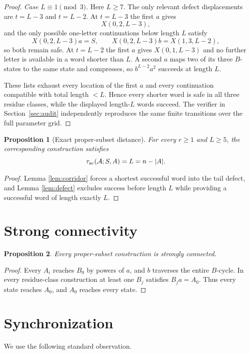 \documentclass[11pt]{article}
\newtheorem{proposition}{Proposition}
\theoremstyle{definition}
\theoremstyle{remark}
\newcommand{\Acal}{\mathcal A}
\newcommand{\tauac}{\tau_{\rm ac}}
\begin{document}
\begin{proof}
\smallskip
\noindent\emph{Case $L\equiv1\pmod3$.}
Here $L\ge7$. The only relevant defect displacements are $t=L-3$ and $t=L-2$. At $t=L-3$ the first $a$ gives
\[
X(0,2,L-3),
\]
and the only possible one-letter continuations below length $L$ satisfy
\[
X(0,2,L-3)a=S,\qquad
X(0,2,L-3)b=X(1,3,L-2),
\]
so both remain safe. At $t=L-2$ the first $a$ gives $X(0,1,L-3)$ and no further letter is available in a word shorter than $L$. A second $a$ maps two of its three $B$-states to the same state and compresses, so $b^{L-2}a^2$ succeeds at length $L$.

These lists exhaust every location of the first $a$ and every continuation compatible with total length $<L$. Hence every shorter word is safe in all three residue classes, while the displayed length-$L$ words succeed. The verifier in Section~\ref{sec:audit} independently reproduces the same finite transitions over the full parameter grid.
\end{proof}

\begin{proposition}[Exact proper-subset distance]\label{prop:exact}
For every $r\ge1$ and $L\ge5$, the corresponding construction satisfies
\[
\tauac(\Acal;S,A)=L=n-|A|.
\]
\end{proposition}
\begin{proof}
Lemma \ref{lem:corridor} forces a shortest successful word into the tail defect, and Lemma \ref{lem:defect} excludes success before length $L$ while providing a successful word of length exactly $L$.
\end{proof}

\section{Strong connectivity}
\begin{proposition}\label{prop:sc}
Every proper-subset construction is strongly connected.
\end{proposition}
\begin{proof}
Every $A_i$ reaches $B_0$ by powers of $a$, and $b$ traverses the entire $B$-cycle. In every residue-class construction at least one $B_j$ satisfies $B_j a=A_0$. Thus every state reaches $A_0$, and $A_0$ reaches every state.
\end{proof}

\section{Synchronization}
We use the following standard observation.
\end{document}
